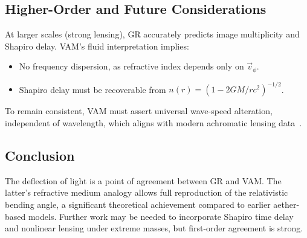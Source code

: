 \subsection*{Higher-Order and Future Considerations}
At larger scales (strong lensing), GR accurately predicts image multiplicity and Shapiro delay. VAM’s fluid interpretation implies:
\begin{itemize}
    \item No frequency dispersion, as refractive index depends only on $\vec{v}_\phi$.
    \item Shapiro delay must be recoverable from $n(r) = (1 - 2GM/rc^2)^{-1/2}$.
\end{itemize}
To remain consistent, VAM must assert universal wave-speed alteration, independent of wavelength, which aligns with modern achromatic lensing data~\cite{eubanks1997vla,shapiro2004gravitational}.

\subsection*{Conclusion}
The deflection of light is a point of agreement between GR and VAM. The latter’s refractive medium analogy allows full reproduction of the relativistic bending angle, a significant theoretical achievement compared to earlier aether-based models. Further work may be needed to incorporate Shapiro time delay and nonlinear lensing under extreme masses, but first-order agreement is strong.